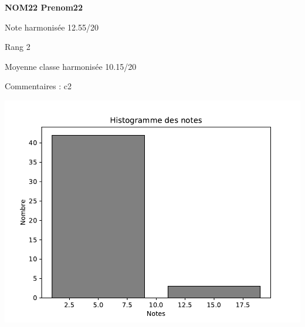 \begin{minipage}[c]{.45\linewidth} 
\Large \textbf{\textsf{NOM22 Prenom22}} 
 
 \normalsize Note harmonisée 12.55/20 
 
Rang 2
 
Moyenne classe harmonisée 10.15/20 
 
Commentaires : 
c2 
\end{minipage}\hfill 
\begin{minipage}[c]{.45\linewidth}  
\begin{center}
\includegraphics[width=.8\linewidth]{../histo.pdf} 
\end{center}
\end{minipage}
\footnotesize 
